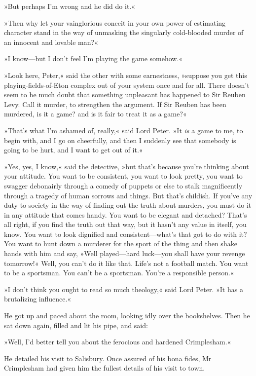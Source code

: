 »But perhaps I'm wrong and he did do it.«

»Then why let your vainglorious conceit in your own power of estimating character stand in the way of unmasking the singularly cold-blooded murder of an innocent and lovable man?«

»I know\allowbreak---\allowbreak but I don't feel I'm playing the game somehow.«

»Look here, Peter,« said the other with some earnestness, »suppose you get this playing-fields-of-Eton complex out of your system once and for all. There doesn't seem to be much doubt that something unpleasant has happened to Sir Reuben Levy. Call it murder, to strengthen the argument. If Sir Reuben has been murdered, is it a game? and is it fair to treat it as a game?«

»That's what I'm ashamed of, really,« said Lord Peter. »It \textit{is} a game to me, to begin with, and I go on cheerfully, and then I suddenly see that somebody is going to be hurt, and I want to get out of it.«

»Yes, yes, I know,« said the detective, »but that's because you're thinking about your attitude. You want to be consistent, you want to look pretty, you want to swagger debonairly through a comedy of puppets or else to stalk magnificently through a tragedy of human sorrows and things. But that's childish. If you've any duty to society in the way of finding out the truth about murders, you must do it in any attitude that comes handy. You want to be elegant and detached? That's all right, if you find the truth out that way, but it hasn't any value in itself, you know. You want to look dignified and consistent\allowbreak---\allowbreak what's that got to do with it? You want to hunt down a murderer for the sport of the thing and then shake hands with him and say, »Well played\allowbreak---\allowbreak hard luck\allowbreak---\allowbreak you shall have your revenge tomorrow!« Well, you can't do it like that. Life's not a football match. You want to be a sportsman. You can't be a sportsman. You're a responsible person.«

»I don't think you ought to read so much theology,« said Lord Peter. »It has a brutalizing influence.«

He got up and paced about the room, looking idly over the bookshelves. Then he sat down again, filled and lit his pipe, and said:

»Well, I'd better tell you about the ferocious and hardened Crimplesham.«

He detailed his visit to Salisbury. Once assured of his bona fides, Mr Crimplesham had given him the fullest details of his visit to town.


